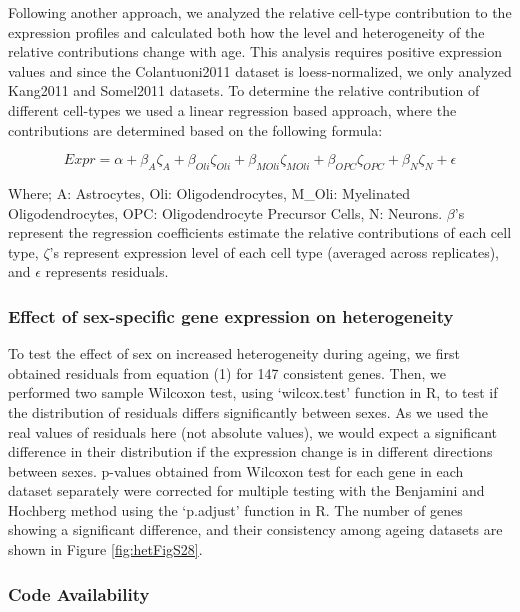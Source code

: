 \documentclass[12pt,twoside]{unicam}
\begin{document}
Following another approach, we analyzed the relative cell-type contribution to the expression profiles and calculated both how the level and heterogeneity of the relative contributions change with age. This analysis requires positive expression values and since the Colantuoni2011 dataset is loess-normalized, we only analyzed Kang2011 and Somel2011 datasets. To determine the relative contribution of different cell-types we used a linear regression based approach, where the contributions are determined based on the following formula:

\begin{equation}
    Expr = \alpha + \beta_{A}\zeta_{A} + \beta_{Oli}\zeta_{Oli} + \beta_{MOli}\zeta_{MOli} + \beta_{OPC}\zeta_{OPC} + \beta_{N}\zeta_{N} + \epsilon
  \label{eq:heteq2}
\end{equation}

Where; A: Astrocytes, Oli: Oligodendrocytes, M\_Oli: Myelinated Oligodendrocytes, OPC: Oligodendrocyte Precursor Cells, N: Neurons. \(\beta\)'s represent the regression coefficients estimate the relative contributions of each cell type, \(\zeta\)'s represent expression level of each cell type (averaged across replicates), and \(\epsilon\) represents residuals.

\hypertarget{effect-of-sex-specific-gene-expression-on-heterogeneity}{%
\subsubsection{Effect of sex-specific gene expression on heterogeneity}\label{effect-of-sex-specific-gene-expression-on-heterogeneity}}

To test the effect of sex on increased heterogeneity during ageing, we first obtained residuals from equation (1) for 147 consistent genes. Then, we performed two sample Wilcoxon test, using `wilcox.test' function in R, to test if the distribution of residuals differs significantly between sexes. As we used the real values of residuals here (not absolute values), we would expect a significant difference in their distribution if the expression change is in different directions between sexes. p-values obtained from Wilcoxon test for each gene in each dataset separately were corrected for multiple testing with the Benjamini and Hochberg method using the `p.adjust' function in R. The number of genes showing a significant difference, and their consistency among ageing datasets are shown in Figure \ref{fig:hetFigS28}.

\hypertarget{code-availability}{%
\subsubsection{Code Availability}\label{code-availability}}
\end{document}
